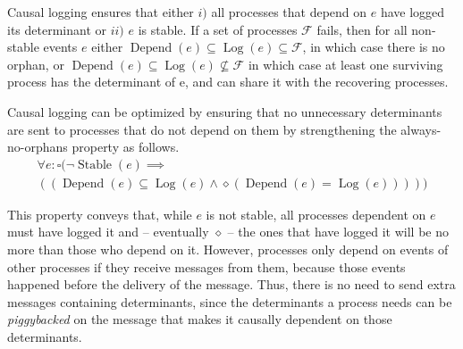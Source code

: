 \documentclass[sigconf]{acmart}
\DeclareMathOperator{\Stable}{Stable}
\DeclareMathOperator{\Depend}{Depend}
\DeclareMathOperator{\Log}{Log}
\begin{document}
Causal logging ensures that either $i)$ all processes that depend on $e$ have logged its determinant or $ii)$ $e$ is stable. If a set of processes $\mathcal{F}$ fails, then for all non-stable events $e$ either $\Depend(e) \subseteq \Log(e) \subseteq \mathcal{F}$, in which case there is no orphan, or $\Depend(e) \subseteq \Log(e) \nsubseteq \mathcal{F}$ in which case at least one surviving process has the determinant of e, and can share it with the recovering processes. %

Causal logging can be optimized by ensuring that no unnecessary determinants are sent to processes that do not depend on them by strengthening the always-no-orphans property as follows.
\begin{equation}\label{eq:causal}
\begin{multlined}
  \forall e: \square ( \neg \Stable(e) \implies \\
  ((\Depend(e) \subseteq \Log(e) \wedge \diamond (\Depend(e) = \Log(e)))))
\end{multlined}
\end{equation}

This property conveys that, while $e$ is not stable, all processes dependent on $e$ must have logged it and  -- eventually $\diamond$ -- the ones that have logged it will be no more than those who depend on it. 
However, processes only depend on events of other processes if they receive  messages from them, because those events happened before the delivery of the message. Thus, there is no need to send extra messages containing determinants, since the determinants a process needs can be \textit{piggybacked} on the message that makes it causally dependent on those determinants.
\end{document}
